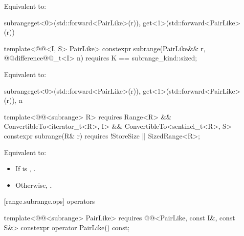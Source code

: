 {\begin{itemdescr}
\pnum
\effects Equivalent to:
\begin{codeblock}
subrange{get<0>(std::forward<PairLike>(r)), get<1>(std::forward<PairLike>(r))}
\end{codeblock}
\end{itemdescr}

%
\begin{itemdecl}
template<@@<I, S> PairLike>
constexpr subrange(PairLike&& r, @@difference@@_t<I> n)
  requires K == subrange_kind::sized;
\end{itemdecl}

\begin{itemdescr}
\pnum
\effects Equivalent to:
\begin{codeblock}
subrange{get<0>(std::forward<PairLike>(r)), get<1>(std::forward<PairLike>(r)), n}
\end{codeblock}
\end{itemdescr}

{\color{oldclr}
%
\begin{itemdecl}
template<@@<subrange> R>
  requires Range<R> && ConvertibleTo<iterator_t<R>, I> && ConvertibleTo<sentinel_t<R>, S>
constexpr subrange(R& r) requires !StoreSize || SizedRange<R>;
\end{itemdecl}

\begin{itemdescr}
\pnum
\effects Equivalent to:
\begin{itemize}
\item If  is ,
.
\item Otherwise,
.
\end{itemize}
\end{itemdescr}
} %

[range.subrange.ops]{ operators}

%
\begin{itemdecl}
template<@@<subrange> PairLike>
  requires @@<PairLike, const I&, const S&>
constexpr operator PairLike() const;
\end{itemdecl}

}
